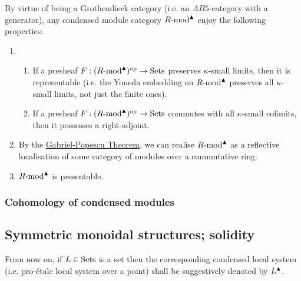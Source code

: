             \begin{corollary} \label{coro: condensed_modules_properties}
                By virtue of being a Grothendieck category (i.e. an $AB5$-category with a generator), any condensed module category $R\text{-}\mathrm{mod}^{\blacktriangle}$ enjoy the following properties:
                    \begin{enumerate}
                        \item 
                            \begin{enumerate}
                                \item If a presheaf $F: (R\text{-}\mathrm{mod}^{\blacktriangle})^{\mathrm{op}} \to \mathrm{Sets}$ preserves $\kappa$-small limits, then it is representable (i.e. the Yoneda embedding on $R\text{-}\mathrm{mod}^{\blacktriangle}$ preserves all $\kappa$-small limits, not just the finite ones).
                                \item If a presheaf $F: (R\text{-}\mathrm{mod}^{\blacktriangle})^{\mathrm{op}} \to \mathrm{Sets}$ commutes with all $\kappa$-small colimits, then it possesses a right-adjoint. 
                            \end{enumerate}
                        \item By the \href{https://ncatlab.org/nlab/show/Gabriel-Popescu+theorem}{\underline{Gabriel-Popescu Theorem}}, we can realise $R\text{-}\mathrm{mod}^{\blacktriangle}$ as a reflective localisation of some category of modules over a commutative ring. 
                        \item $R\text{-}\mathrm{mod}^{\blacktriangle}$ is presentable. 
                    \end{enumerate}
            \end{corollary}
            
        \subsubsection{Cohomology of condensed modules}
        
    \subsection{Symmetric monoidal structures; solidity}
        \begin{convention}
            From now on, if $L \in \mathrm{Sets}$ is a set then the corresponding condensed local system (i.e. pro-\'etale local system over a point) shall be suggestively denoted by $L^{\blacktriangle}$.
        \end{convention}
    
